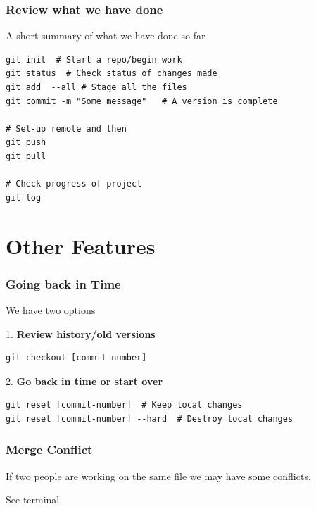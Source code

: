 \documentclass{beamer}
\begin{document}
\begin{frame}[fragile]
\frametitle{Review what we have done}
A short summary of what we have done so far
\begin{verbatim}
git init  # Start a repo/begin work
git status  # Check status of changes made
git add  --all # Stage all the files
git commit -m "Some message"   # A version is complete

# Set-up remote and then
git push
git pull

# Check progress of project
git log
\end{verbatim}
\end{frame}


\section{Other Features}


\begin{frame}[fragile]
\frametitle{Going back in Time}
We have two options 

1. \textbf{Review history/old versions}
\begin{verbatim}
git checkout [commit-number] 
\end{verbatim}

2. \textbf{Go back in time or start over}
\begin{verbatim}
git reset [commit-number]  # Keep local changes
git reset [commit-number] --hard  # Destroy local changes
\end{verbatim}
\end{frame}

\begin{frame}
\frametitle{Merge Conflict}
If two people are working on the same file we may have some conflicts.

See terminal
\end{frame}
\end{document}
